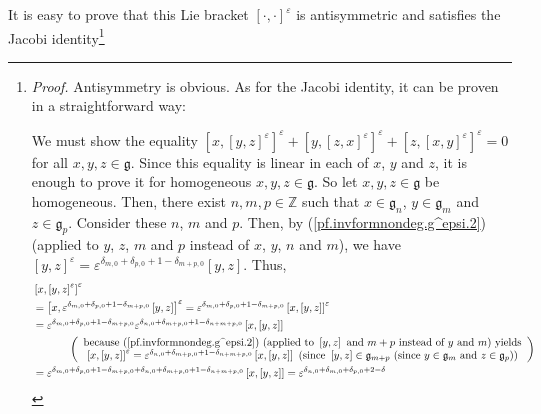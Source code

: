 \documentclass
[numbers=enddot,12pt,final,onecolumn,german,notitlepage]{scrartcl}%
\theoremstyle{definition}
\begin{document}
It is easy to prove that this Lie bracket $\left[  \cdot,\cdot\right]
^{\varepsilon}$ is antisymmetric and satisfies the Jacobi
identity\footnote{\textit{Proof.} Antisymmetry is obvious. As for the Jacobi
identity, it can be proven in a straightforward way:
\par
We must show the equality $\left[  x,\left[  y,z\right]  ^{\varepsilon
}\right]  ^{\varepsilon}+\left[  y,\left[  z,x\right]  ^{\varepsilon}\right]
^{\varepsilon}+\left[  z,\left[  x,y\right]  ^{\varepsilon}\right]
^{\varepsilon}=0$ for all $x,y,z\in\mathfrak{g}$. Since this equality is
linear in each of $x$, $y$ and $z$, it is enough to prove it for homogeneous
$x,y,z\in\mathfrak{g}$. So let $x,y,z\in\mathfrak{g}$ be homogeneous. Then,
there exist $n,m,p\in\mathbb{Z}$ such that $x\in\mathfrak{g}_{n}$,
$y\in\mathfrak{g}_{m}$ and $z\in\mathfrak{g}_{p}$. Consider these $n$, $m$ and
$p$. Then, by (\ref{pf.invformnondeg.g^epsi.2}) (applied to $y$, $z$, $m$ and
$p$ instead of $x$, $y$, $n$ and $m$), we have $\left[  y,z\right]
^{\varepsilon}=\varepsilon^{\delta_{m,0}+\delta_{p,0}+1-\delta_{m+p,0}}\left[
y,z\right]  $. Thus,%
\begin{align*}
&  \left[  x,\left[  y,z\right]  ^{\varepsilon}\right]  ^{\varepsilon}\\
&  =\left[  x,\varepsilon^{\delta_{m,0}+\delta_{p,0}+1-\delta_{m+p,0}}\left[
y,z\right]  \right]  ^{\varepsilon}=\varepsilon^{\delta_{m,0}+\delta
_{p,0}+1-\delta_{m+p,0}}\left[  x,\left[  y,z\right]  \right]  ^{\varepsilon
}\\
&  =\varepsilon^{\delta_{m,0}+\delta_{p,0}+1-\delta_{m+p,0}}\varepsilon
^{\delta_{n,0}+\delta_{m+p,0}+1-\delta_{n+m+p,0}}\left[  x,\left[  y,z\right]
\right] \\
&  \ \ \ \ \ \ \ \ \ \ \left(
\begin{array}
[c]{c}%
\text{because (\ref{pf.invformnondeg.g^epsi.2}) (applied to }\left[
y,z\right]  \text{ and }m+p\text{ instead of }y\text{ and }m\text{) yields}\\
\left[  x,\left[  y,z\right]  \right]  ^{\varepsilon}=\varepsilon
^{\delta_{n,0}+\delta_{m+p,0}+1-\delta_{n+m+p,0}}\left[  x,\left[  y,z\right]
\right]  \text{ (since }\left[  y,z\right]  \in\mathfrak{g}_{m+p}\text{ (since
}y\in\mathfrak{g}_{m}\text{ and }z\in\mathfrak{g}_{p}\text{))}%
\end{array}
\right) \\
&  =\varepsilon^{\delta_{m,0}+\delta_{p,0}+1-\delta_{m+p,0}+\delta
_{n,0}+\delta_{m+p,0}+1-\delta_{n+m+p,0}}\left[  x,\left[  y,z\right]
\right]  =\varepsilon^{\delta_{n,0}+\delta_{m,0}+\delta_{p,0}+2-\delta
}
\end{align*}}
\end{document}

